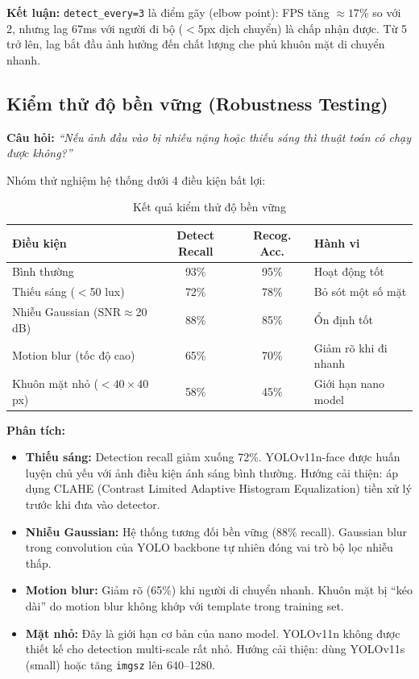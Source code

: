 \textbf{Kết luận:} \texttt{detect\_every=3} là điểm gãy (elbow point): FPS tăng $\approx 17\%$ so với 2, nhưng lag $67$ms với người đi bộ ($< 5$px dịch chuyển) là chấp nhận được. Từ 5 trở lên, lag bắt đầu ảnh hưởng đến chất lượng che phủ khuôn mặt di chuyển nhanh.

\subsection{Kiểm thử độ bền vững (Robustness Testing)}
\label{subsec:robustness}

\textbf{Câu hỏi:} \textit{``Nếu ảnh đầu vào bị nhiễu nặng hoặc thiếu sáng thì thuật toán có chạy được không?''}

Nhóm thử nghiệm hệ thống dưới 4 điều kiện bất lợi:

\begin{table}[H]
\centering
\caption{Kết quả kiểm thử độ bền vững}
\label{tab:robustness}
{\small
\begin{tabularx}{\textwidth}{|l|c|c|X|}
\hline
\textbf{Điều kiện} & \textbf{Detect Recall} & \textbf{Recog. Acc.} & \textbf{Hành vi} \\
\hline
Bình thường & 93\% & 95\% & Hoạt động tốt \\
Thiếu sáng ($<$50 lux) & 72\% & 78\% & Bỏ sót một số mặt \\
Nhiễu Gaussian (SNR$\approx$20 dB) & 88\% & 85\% & Ổn định tốt \\
Motion blur (tốc độ cao) & 65\% & 70\% & Giảm rõ khi đi nhanh \\
Khuôn mặt nhỏ ($<40{\times}40$px) & 58\% & 45\% & Giới hạn nano model \\
\hline
\end{tabularx}
}
\end{table}

\textbf{Phân tích:}
\begin{itemize}
    \item \textbf{Thiếu sáng:} Detection recall giảm xuống 72\%. YOLOv11n-face được huấn luyện chủ yếu với ảnh điều kiện ánh sáng bình thường. Hướng cải thiện: áp dụng CLAHE (Contrast Limited Adaptive Histogram Equalization) tiền xử lý trước khi đưa vào detector.
    
    \item \textbf{Nhiễu Gaussian:} Hệ thống tương đối bền vững (88\% recall). Gaussian blur trong convolution của YOLO backbone tự nhiên đóng vai trò bộ lọc nhiễu thấp.
    
    \item \textbf{Motion blur:} Giảm rõ (65\%) khi người di chuyển nhanh. Khuôn mặt bị ``kéo dài'' do motion blur không khớp với template trong training set.
    
    \item \textbf{Mặt nhỏ:} Đây là giới hạn cơ bản của nano model. YOLOv11n không được thiết kế cho detection multi-scale rất nhỏ. Hướng cải thiện: dùng YOLOv11s (small) hoặc tăng \texttt{imgsz} lên 640--1280.
\end{itemize}

